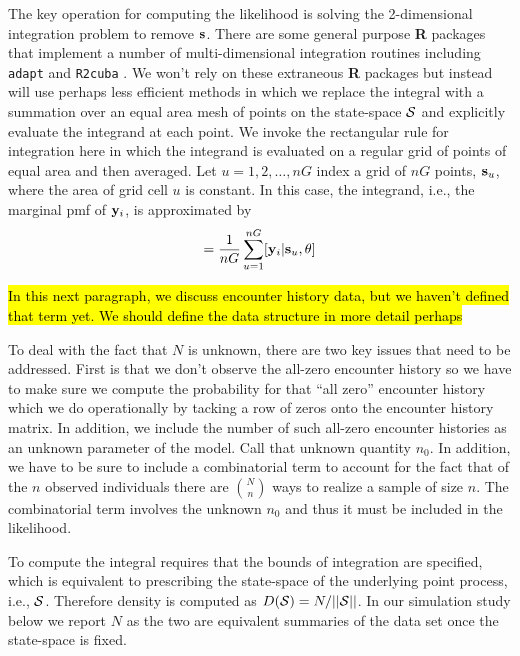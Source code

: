 \documentclass[12pt]{article}
\begin{document}
The key operation for computing the likelihood is solving the
2-dimensional integration problem to remove ${\bf s}$. There are some
general purpose {\bf R} packages that implement a number of
multi-dimensional integration routines including \mbox{\tt adapt}
\citep{genz_etal:2007} and \mbox{\tt R2cuba} \citep{hahn_etal:2011}.
We won't rely on these extraneous {\bf R} packages but instead will
use perhaps less efficient methods in which we replace the integral
with a summation over an equal area mesh of points on the state-space
${\cal S}$ and explicitly evaluate the integrand at each point. We
invoke the rectangular rule for integration here in which the
integrand is evaluated on a regular grid of points of equal area and
then averaged.  Let $u=1,2,\ldots,nG$ index a grid of $nG$ points,
${\bf s}_{u}$, where the area of grid cell $u$ is constant.  In this
case, the integrand, i.e., the marginal pmf of ${\bf y}_{i}$, is
approximated by
\begin{equation}
         [{\bf y}_{i}|\theta] = \frac{1}{nG} \sum_{u=1}^{nG}  [ {\bf
            y}_{i} |{\bf s}_u, \theta]
\label{mle.eq.intlik}
\end{equation}

\hl{In this next paragraph, we discuss encounter history data, but we
  haven't defined that term yet. We should define the data structure
  in more detail perhaps}

To deal with the fact that $N$ is unknown,
there are two key issues that need to be addressed.
First is that
we don't observe the all-zero encounter history so we have to
make sure we compute the probability for that ``all zero'' encounter history which
we do operationally by tacking a row of zeros onto the encounter history matrix. In
addition, we include the number of such all-zero encounter histories
as an unknown parameter of the model. Call that unknown quantity $n_{0}$.
In addition, we have to be sure to include a combinatorial term to
account for the fact that of the $n$ observed individuals there are
${N \choose n}$
 ways to realize a sample of size $n$. The combinatorial term
involves the unknown $n_{0}$ and thus it must be included in the likelihood.

To compute the integral requires that the bounds of integration are
specified, which is equivalent to prescribing the state-space of the
underlying point process, i.e., ${\cal S}$. Therefore density is
computed as $D({\cal S}) = N/||{\cal S}||$. In our simulation study
below we report $N$ as the two are equivalent summaries of the data
set once the state-space is fixed.
\end{document}
